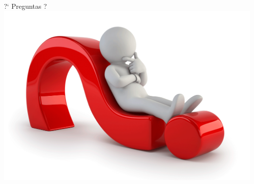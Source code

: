 \documentclass[compress]{beamer}
\begin{document}
\begin{frame}
  \begin{center}

  {\Huge ?` Preguntas ?}
  \\
  \includegraphics[scale=0.235]{imagenes/preguntas.png}

  \end{center}
\end{frame}
\end{document}
